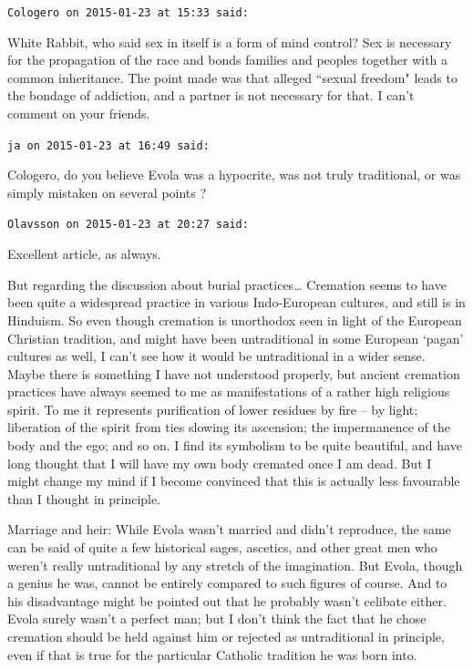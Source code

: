 \begin{footnotesize}
\begin{sffamily}
\hfill

\texttt{Cologero on 2015-01-23 at 15:33 said: }

White Rabbit, who said sex in itself is a form of mind control? Sex is necessary for the propagation of the race and bonds families and peoples together with a common inheritance. The point made was that alleged ``sexual freedom" leads to the bondage of addiction, and a partner is not necessary for that. I can't comment on your friends.


\hfill

\texttt{ja on 2015-01-23 at 16:49 said: }

Cologero, do you believe Evola was a hypocrite, was not truly traditional, or was simply mistaken on several points ?


\hfill

\texttt{Olavsson on 2015-01-23 at 20:27 said: }

Excellent article, as always.

But regarding the discussion about burial practices… Cremation seems to have been quite a widespread practice in various Indo-European cultures, and still is in Hinduism. So even though cremation is unorthodox seen in light of the European Christian tradition, and might have been untraditional in some European `pagan' cultures as well, I can't see how it would be untraditional in a wider sense. Maybe there is something I have not understood properly, but ancient cremation practices have always seemed to me as manifestations of a rather high religious spirit. To me it represents purification of lower residues by fire – by light; liberation of the spirit from ties slowing its ascension; the impermanence of the body and the ego; and so on. I find its symbolism to be quite beautiful, and have long thought that I will have my own body cremated once I am dead. But I might change my mind if I become convinced that this is actually less favourable than I thought in principle.

Marriage and heir: While Evola wasn't married and didn't reproduce, the same can be said of quite a few historical sages, ascetics, and other great men who weren't really untraditional by any stretch of the imagination. But Evola, though a genius he was, cannot be entirely compared to such figures of course. And to his disadvantage might be pointed out that he probably wasn't celibate either. Evola surely wasn't a perfect man; but I don't think the fact that he chose cremation should be held against him or rejected as untraditional in principle, even if that is true for the particular Catholic tradition he was born into.



\end{sffamily}
\end{footnotesize}
